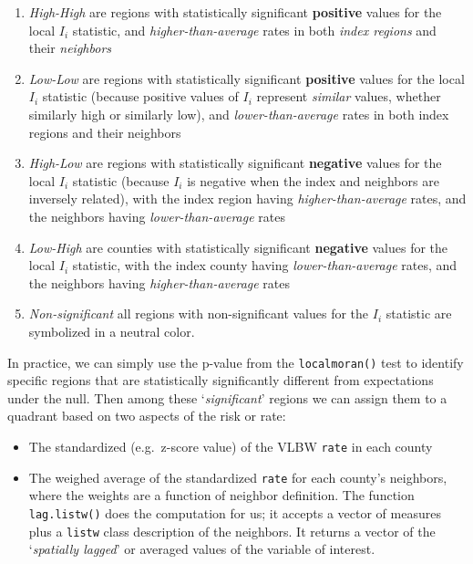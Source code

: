 \documentclass[
]{book}
\newcommand{\passthrough}[1]{#1}
\providecommand{\tightlist}{%
  \setlength{\itemsep}{0pt}\setlength{\parskip}{0pt}}
\begin{document}
\begin{enumerate}
\def\labelenumi{\arabic{enumi}.}
\tightlist
\item
  \emph{High-High} are regions with statistically significant \textbf{positive} values for the local \(I_i\) statistic, and \emph{higher-than-average} rates in both \emph{index regions} and their \emph{neighbors}
\item
  \emph{Low-Low} are regions with statistically significant \textbf{positive} values for the local \(I_i\) statistic (because positive values of \(I_i\) represent \emph{similar} values, whether similarly high or similarly low), and \emph{lower-than-average} rates in both index regions and their neighbors
\item
  \emph{High-Low} are regions with statistically significant \textbf{negative} values for the local \(I_i\) statistic (because \(I_i\) is negative when the index and neighbors are inversely related), with the index region having \emph{higher-than-average} rates, and the neighbors having \emph{lower-than-average} rates
\item
  \emph{Low-High} are counties with statistically significant \textbf{negative} values for the local \(I_i\) statistic, with the index county having \emph{lower-than-average} rates, and the neighbors having \emph{higher-than-average} rates
\item
  \emph{Non-significant} all regions with non-significant values for the \(I_i\) statistic are symbolized in a neutral color.
\end{enumerate}

In practice, we can simply use the p-value from the \passthrough{\lstinline!localmoran()!} test to identify specific regions that are statistically significantly different from expectations under the null. Then among these `\emph{significant}' regions we can assign them to a quadrant based on two aspects of the risk or rate:

\begin{itemize}
\tightlist
\item
  The standardized (e.g.~z-score value) of the VLBW \passthrough{\lstinline!rate!} in each county
\item
  The weighed average of the standardized \passthrough{\lstinline!rate!} for each county's neighbors, where the weights are a function of neighbor definition. The function \passthrough{\lstinline!lag.listw()!} does the computation for us; it accepts a vector of measures plus a \passthrough{\lstinline!listw!} class description of the neighbors. It returns a vector of the `\emph{spatially lagged}' or averaged values of the variable of interest.
\end{itemize}
\end{document}

